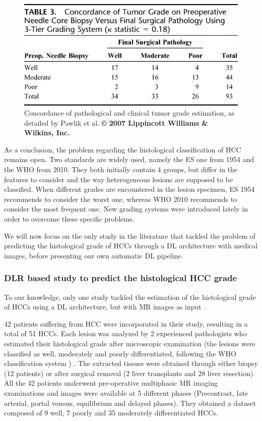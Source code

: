 \documentclass[]{article}
\begin{document}
\begin{figure}[th!]
\centering
\includegraphics[width=0.7\linewidth]{images/pawlik_table3}
\caption{Concordance of pathological and clinical tumor grade estimation, as detailed by Pawlik et al. \textbf{© 2007 Lippincott Williams \& Wilkins, Inc. \cite{Pawlik2007}}}
\label{fig:pawlik_table3}
\end{figure}


As a conclusion, the problem regarding the histological classification
of HCC remains open. Two standards are widely used, namely the ES one
from 1954 and the WHO from 2010. They both initially contain 4 groups,
but differ in the features to consider and the way heterogeneous lesions
are supposed to be classified. When different grades are encountered in
the lesion specimen, ES 1954 recommends to consider the worst one,
whereas WHO 2010 recommends to consider the most frequent one. New
grading systems were introduced lately in order to overcome these
specific problems.

We will now focus on the only study in the literature that tackled the
problem of predicting the histological grade of HCCs through a DL
architecture with medical images, before presenting our own automatic DL
pipeline.

\subsubsection{DLR based study to predict the histological HCC
grade}\label{dlr-based-study-to-predict-the-histological-hcc-grade}

To our knowledge, only one study tackled the estimation of the
histological grade of HCCs using a DL architecture, but with MR images
as input \cite{Yang2019}.

42 patients suffering from HCC were incorporated in their study,
resulting in a total of 51 HCCs. Each lesion was analyzed by 2
experienced pathologists who estimated their histological grade after
microscopic examination (the lesions were classified as well, moderately
and poorly differentiated, following the WHO classification system \cite{20113051318}) .
The extracted tissues were obtained through either biopsy (12 patients)
or after surgical removal (2 liver transplants and 28 liver resection).
All the 42 patients underwent pre-operative multiphasic MR imaging
examinations and images were available at 5 different phases
(Precontrast, late arterial, portal venous, equilibrium and delayed
phases). They obtained a dataset composed of 9 well, 7 poorly and 35 moderately
differentiated HCCs.
\end{document}
